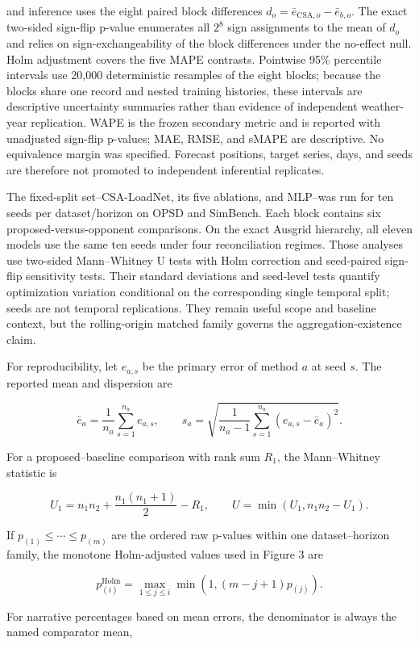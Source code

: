 \documentclass[electronics,article,submit,moreauthors]{Definitions/mdpi}
\begin{document}
and inference uses the eight paired block differences \(d_o=\bar e_{\mathrm{CSA},o}-\bar e_{b,o}\). The exact two-sided sign-flip p-value enumerates all \(2^8\) sign assignments to the mean of \(d_o\) and relies on sign-exchangeability of the block differences under the no-effect null. Holm adjustment covers the five MAPE contrasts. Pointwise 95\% percentile intervals use 20,000 deterministic resamples of the eight blocks; because the blocks share one record and nested training histories, these intervals are descriptive uncertainty summaries rather than evidence of independent weather-year replication. WAPE is the frozen secondary metric and is reported with unadjusted sign-flip p-values; MAE, RMSE, and sMAPE are descriptive. No equivalence margin was specified. Forecast positions, target series, days, and seeds are therefore not promoted to independent inferential replicates.

The fixed-split set--CSA-LoadNet, its five ablations, and MLP--was run for ten seeds per dataset/horizon on OPSD and SimBench. Each block contains six proposed-versus-opponent comparisons. On the exact Ausgrid hierarchy, all eleven models use the same ten seeds under four reconciliation regimes. Those analyses use two-sided Mann--Whitney U tests with Holm correction and seed-paired sign-flip sensitivity tests. Their standard deviations and seed-level tests quantify optimization variation conditional on the corresponding single temporal split; seeds are not temporal replications. They remain useful scope and baseline context, but the rolling-origin matched family governs the aggregation-existence claim.

For reproducibility, let \(e_{a,s}\) be the primary error of method \(a\) at seed \(s\). The reported mean and dispersion are

\[
\bar e_a=\frac{1}{n_a}\sum_{s=1}^{n_a}e_{a,s},\qquad
s_a=\sqrt{\frac{1}{n_a-1}\sum_{s=1}^{n_a}(e_{a,s}-\bar e_a)^2}.
\]

For a proposed--baseline comparison with rank sum \(R_1\), the Mann--Whitney statistic is

\[
U_1=n_1n_2+\frac{n_1(n_1+1)}{2}-R_1,\qquad
U=\min(U_1,n_1n_2-U_1).
\]

If \(p_{(1)}\leq\cdots\leq p_{(m)}\) are the ordered raw p-values within one dataset--horizon family, the monotone Holm-adjusted values used in Figure 3 are

\[
p^{\mathrm{Holm}}_{(i)}=
\max_{1\leq j\leq i}\min\!\left(1,(m-j+1)p_{(j)}\right).
\]

For narrative percentages based on mean errors, the denominator is always the named comparator mean,
\end{document}

